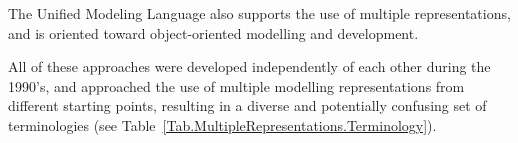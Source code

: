 \documentclass[10pt]{llncs}
\begin{document}
The Unified Modeling Language \cite{OMG:1999:UML} also supports the use of multiple representations, and is oriented toward object-oriented modelling and development.

All of these approaches were developed independently of each other during the 1990's, and approached the use of multiple modelling representations from different starting points, resulting in a diverse and potentially confusing set of terminologies (see Table~\ref{Tab.MultipleRepresentations.Terminology}).


\newlength{\wEG}
\newlength{\wFink}
\newlength{\wEast}
\newlength{\wDnS}
\newlength{\wAtze}
\newlength{\wSu}
\newlength{\wUML}
\newlength{\wGrun}
\newlength{\wA}
\end{document}
